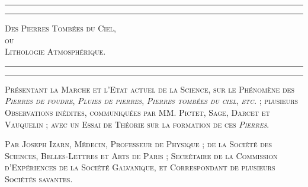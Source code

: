 \documentclass[a4paper, 11pt, oneside, polutonikogreek, french]{article}
\begin{document}
\Fontauri
\renewcommand{\contentsname}{
\Fontauri{Table des matières}
}
\renewcommand\thefootnote{\Fontauri{\arabic{footnote}}}
\begin{titlepage} %
	\centering %

	
	\rule{\textwidth}{1.6pt}\vspace*{-\baselineskip}\vspace*{2pt} %
	\rule{\textwidth}{0.4pt} %
	
	\vspace{1\baselineskip} %
	
	{\scshape\Huge Des Pierres Tombées du Ciel,\\ ou\\ Lithologie Atmosphérique.}
	
	\vspace{1\baselineskip} %

	\rule{\textwidth}{0.4pt}\vspace*{-\baselineskip}\vspace{3.2pt} %
	\rule{\textwidth}{1.6pt} %
	
	\vspace{1\baselineskip} %
	
	
	{\scshape \Large Présentant la Marche et l'Etat actuel de la Science, sur le Phénomène des \emph{Pierres de foudre}, \emph{Pluies de pierres}, \emph{Pierres tombées du ciel}, \emph{etc.} ; plusieurs Observations inédites, communiquées par MM. Pictet, Sage, Darcet et Vauquelin ; avec un Essai de Théorie sur la formation de ces \emph{Pierres}.} %
	
	\vspace*{1\baselineskip} %
	
        {\scshape Par Joseph Izarn, Médecin, Professeur de Physique ; de la Société des Sciences, Belles-Lettres et Arts de Paris ; Secrétaire de la Commission d'Expériences de la Société Galvanique, et Correspondant de plusieurs Sociétés savantes. } %
    

\end{titlepage}
\end{document}
